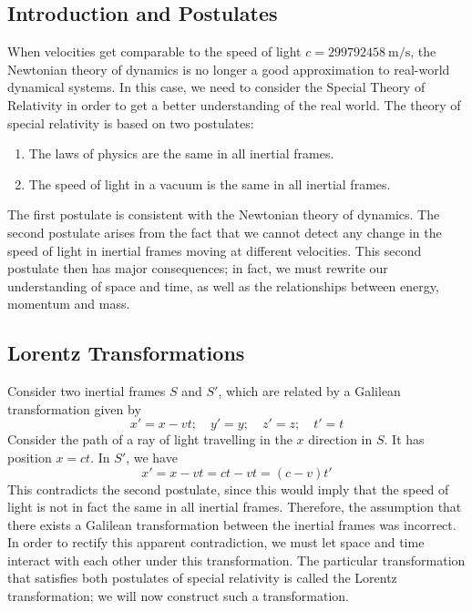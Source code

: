 \subsection{Introduction and Postulates}
When velocities get comparable to the speed of light \(c = \SI{299792458}{\metre\per\second}\), the Newtonian theory of dynamics is no longer a good approximation to real-world dynamical systems.
In this case, we need to consider the Special Theory of Relativity in order to get a better understanding of the real world.
The theory of special relativity is based on two postulates:
\begin{enumerate}
	\item The laws of physics are the same in all inertial frames.
	\item The speed of light in a vacuum is the same in all inertial frames.
\end{enumerate}
The first postulate is consistent with the Newtonian theory of dynamics.
The second postulate arises from the fact that we cannot detect any change in the speed of light in inertial frames moving at different velocities.
This second postulate then has major consequences; in fact, we must rewrite our understanding of space and time, as well as the relationships between energy, momentum and mass.

\subsection{Lorentz Transformations}
Consider two inertial frames \(S\) and \(S'\), which are related by a Galilean transformation given by
\[
	x' = x - vt;\quad y' = y;\quad z' = z;\quad t' = t
\]
Consider the path of a ray of light travelling in the \(x\) direction in \(S\).
It has position \(x = ct\).
In \(S'\), we have
\[
	x' = x - vt = ct - vt = (c-v)t'
\]
This contradicts the second postulate, since this would imply that the speed of light is not in fact the same in all inertial frames.
Therefore, the assumption that there exists a Galilean transformation between the inertial frames was incorrect.
In order to rectify this apparent contradiction, we must let space and time interact with each other under this transformation.
The particular transformation that satisfies both postulates of special relativity is called the Lorentz transformation; we will now construct such a transformation.

